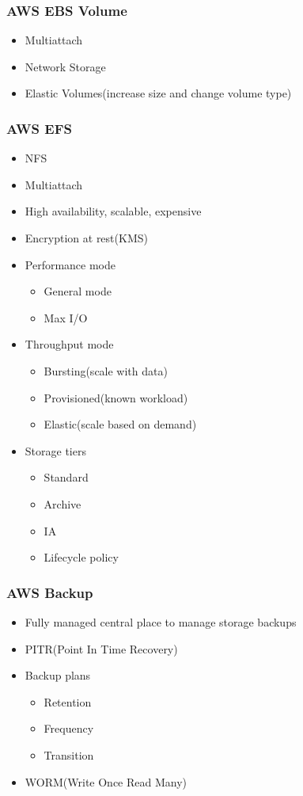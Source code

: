 \documentclass[../main.tex]{subfiles}
\begin{document}
\subsubsection{AWS EBS Volume}
\begin{itemize}
    \item Multiattach
    \item Network Storage
    \item Elastic Volumes(increase size and change volume type)
\end{itemize}

\subsubsection{AWS EFS}
\begin{itemize}
    \item NFS
    \item Multiattach
    \item High availability, scalable, expensive
    \item Encryption at rest(KMS)
    \item Performance mode
    \begin{itemize}
        \item General mode
        \item Max I/O
    \end{itemize}
    \item Throughput mode
    \begin{itemize}
        \item Bursting(scale with data)
        \item Provisioned(known workload)
        \item Elastic(scale based on demand)
    \end{itemize}
    \item Storage tiers
    \begin{itemize}
        \item Standard
        \item Archive
        \item IA
        \item Lifecycle policy
    \end{itemize}
\end{itemize}

\subsubsection{AWS Backup}
\begin{itemize}
    \item Fully managed central place to manage storage backups
    \item PITR(Point In Time Recovery)
    \item Backup plans
    \begin{itemize}
        \item Retention
        \item Frequency
        \item Transition
    \end{itemize}
    \item WORM(Write Once Read Many)
\end{itemize}
\end{document}
